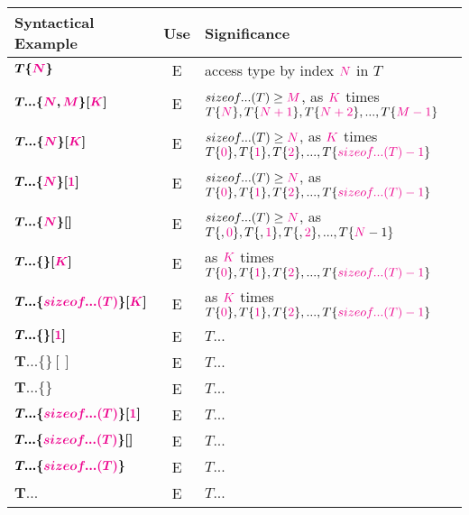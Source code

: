 \begin{tabularx}{\textwidth}{l|c|X}
  \textbf{Syntactical Example} & \textbf{Use}  &\textbf{Significance} \\
\hline
$\bm{T\{\textcolor{Magenta}{N}\}}$ & E & access type by index $\textcolor{Magenta}{N}$ in $T$ \\
$\bm{T...\{\textcolor{Magenta}{N},\textcolor{Magenta}{M}\}[\textcolor{Magenta}{K}]}$ & E & $sizeof...(T)\geq{\textcolor{Magenta}{M}}$, as $\textcolor{Magenta}{K}$ times $ T\{\textcolor{Magenta}{N}\},T\{\textcolor{Magenta}{N+1}\},T\{\textcolor{Magenta}{N+2}\},...,T\{\textcolor{Magenta}{M-1}\}$ \\
$\bm{T...\{\textcolor{Magenta}{N}\}[\textcolor{Magenta}{K}]}$ & E & $sizeof...(T)\geq{\textcolor{Magenta}{N}}$, as $\textcolor{Magenta}{K}$ times $T\{\textcolor{Magenta}{0}\},T\{\textcolor{Magenta}{1}\},T\{\textcolor{Magenta}{2}\},...,T\{\textcolor{Magenta}{sizeof...(T)-1}\}$ \\
$\bm{T...\{\textcolor{Magenta}{N}\}[\textcolor{Magenta}{1}]}$ & E & $sizeof...(T)\geq{\textcolor{Magenta}{N}}$, as $T\{\textcolor{Magenta}{0}\},T\{\textcolor{Magenta}{1}\},T\{\textcolor{Magenta}{2}\},...,T\{\textcolor{Magenta}{sizeof...(T)-1}\}$ \\
$\bm{T...\{\textcolor{Magenta}{N}\}[]}$ & E & $sizeof...(T)\geq{\textcolor{Magenta}{N}}$, as $T\{,\textcolor{Magenta}{0}\},T\{,\textcolor{Magenta}{1}\},T\{,\textcolor{Magenta}{2}\},...,T\{\textcolor{Magenta}{N}-1\}$ \\
$\bm{T...\{\}[\textcolor{Magenta}{K}]}$ & E & as $\textcolor{Magenta}{K}$ times $T\{\textcolor{Magenta}{0}\},T\{\textcolor{Magenta}{1}\},T\{\textcolor{Magenta}{2}\},...,T\{\textcolor{Magenta}{sizeof...(T)-1}\}$ \\
$\bm{T...\{\textcolor{Magenta}{sizeof...(T)}\}[\textcolor{Magenta}{K}]}$ & E & as $\textcolor{Magenta}{K}$ times $T\{\textcolor{Magenta}{0}\},T\{\textcolor{Magenta}{1}\},T\{\textcolor{Magenta}{2}\},...,T\{\textcolor{Magenta}{sizeof...(T)-1}\}$ \\
$\bm{T...\{\}[\textcolor{Magenta}{1}]}$ & E & $T...$ \\
$\bm{T...\{\}[]}$ & E & $T...$ \\
$\bm{T...\{\}}$ & E & $T...$\\
$\bm{T...\{\textcolor{Magenta}{sizeof...(T)}\}[\textcolor{Magenta}{1}]}$ & E & $T...$ \\
$\bm{T...\{\textcolor{Magenta}{sizeof...(T)}\}[]}$ & E & $T...$ \\
$\bm{T...\{\textcolor{Magenta}{sizeof...(T)}\}}$ & E & $T...$\\
$\bm{T...}$ & E & $T...$\\
\end{tabularx}

